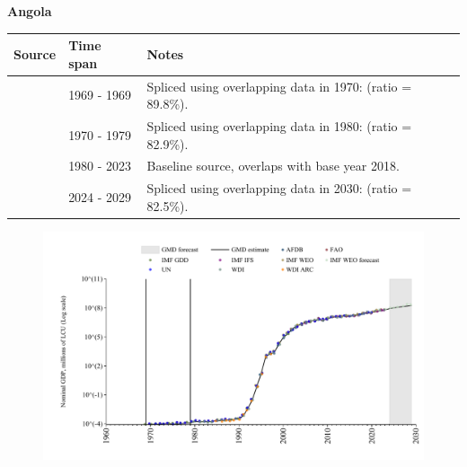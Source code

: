 \documentclass[12pt,a4paper,landscape]{article}
\begin{document}
\begin{adjustbox}{max totalsize={\paperwidth}{\paperheight},center}
\begin{minipage}[t][\textheight][t]{\textwidth}
\vspace*{0.5cm}
{}
\begin{center}
{\Large\bfseries Angola}
\end{center}
\vspace{0.5cm}
\begin{table}[H]
\centering
\small
\begin{tabular}{|l|l|l|}
\hline
\textbf{Source} & \textbf{Time span} & \textbf{Notes} \\
\hline
\rowcolor{white}\cite{IMF_GDD}& 1969 - 1969 &Spliced using overlapping data in 1970: (ratio = 89.8\%).\\
\rowcolor{lightgray}\cite{UN}& 1970 - 1979 &Spliced using overlapping data in 1980: (ratio = 82.9\%).\\
\rowcolor{white}\cite{WDI}& 1980 - 2023 &Baseline source, overlaps with base year 2018.\\
\rowcolor{lightgray}\cite{IMF_WEO_forecast}& 2024 - 2029 &Spliced using overlapping data in 2030: (ratio = 82.5\%).\\
\hline
\end{tabular}
\end{table}
\begin{figure}[H]
\centering
\includegraphics[width=\textwidth,height=0.6\textheight,keepaspectratio]{graphs/AGO_nGDP.pdf}
\end{figure}
\end{minipage}
\end{adjustbox}
\end{document}
